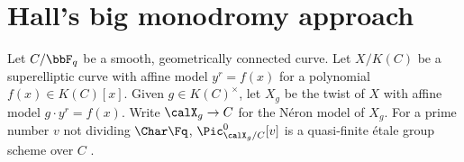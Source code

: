 \section{Hall's big monodromy approach}







Let $C/\bbF_q$ be a smooth, geometrically connected curve. Let $X/K(C)$ be a superelliptic curve with affine model $y^r = f(x)$ for a polynomial $f(x) \in K(C)[x]$. Given $g \in K(C)^\times$, let $X_g$ be the twist of $X$ with affine model $g \cdot y^r = f(x)$. Write $\calX_g \to C$ for the N\'eron model of $X_g$. For a prime number $v$ not dividing $\Char \Fq$, $\Pic^0_{\calX_g/C}[v]$ is a quasi-finite \'etale group scheme over $C$ . 


